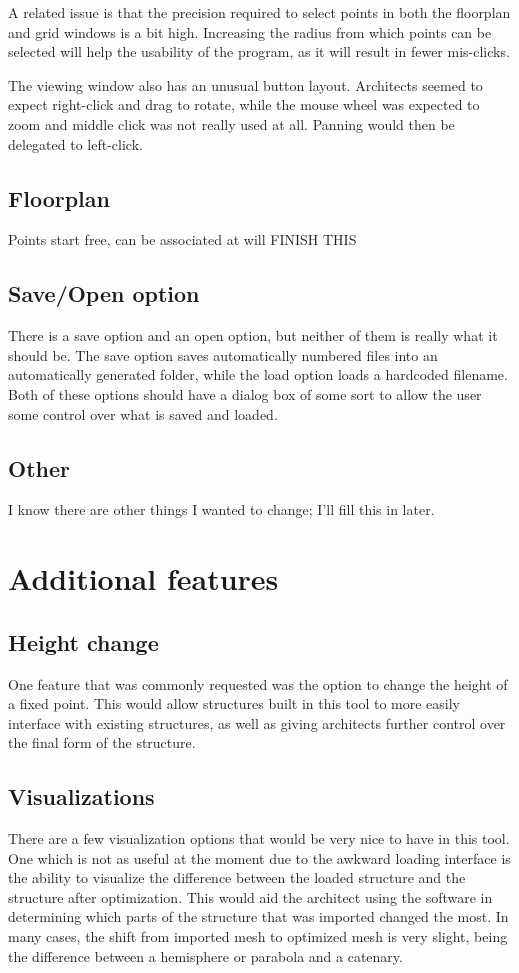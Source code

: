 \documentclass{thesis}
\begin{document}
A related issue is that the precision required to select points in both the floorplan and grid windows is a bit high.  Increasing
the radius from which points can be selected will help the usability of the program, as it will result in fewer mis-clicks.

The viewing window also has an unusual button layout.  Architects seemed to expect right-click and drag to rotate, while the mouse
wheel was expected to zoom and middle click was not really used at all.  Panning would then be delegated to left-click.

\subsection{Floorplan}
Points start free, can be associated at will FINISH THIS

\subsection{Save/Open option}
There is a save option and an open option, but neither of them is really what it should be.  The save option saves automatically
numbered files into an automatically generated folder, while the load option loads a hardcoded filename.  Both of these options
should have a dialog box of some sort to allow the user some control over what is saved and loaded.

\subsection{Other}
I know there are other things I wanted to change; I'll fill this in later.

\section{Additional features}

\subsection{Height change}
One feature that was commonly requested was the option to change the height of a fixed point.  This would allow structures built
in this tool to more easily interface with existing structures, as well as giving architects further control over the final form
of the structure.

\subsection{Visualizations}
There are a few visualization options that would be very nice to have in this tool.  One which is not as useful at the moment due
to the awkward loading interface is the ability to visualize the difference between the loaded structure and the structure after
optimization.  This would aid the architect using the software in determining which parts of the structure that was imported
changed the most.  In many cases, the shift from imported mesh to optimized mesh is very slight, being the difference between
a hemisphere or parabola and a catenary.
\end{document}
